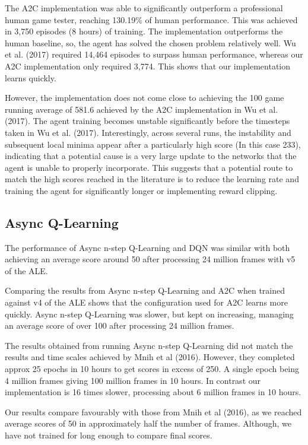 \documentclass{article}
\begin{document}
The A2C implementation was able to significantly outperform a professional human game tester, reaching 130.19\% of human performance. This was achieved in 3,750 episodes (8 hours) of training. The implementation outperforms the human baseline, so, the agent has solved the chosen problem relatively well. Wu et al. (2017) required 14,464 episodes to surpass human performance, whereas our A2C implementation only required 3,774. This shows that our implementation learns quickly.

However, the implementation does not come close to achieving the 100 game running average of 581.6 achieved by the A2C implementation in Wu et al. (2017). The agent training becomes unstable significantly before the timesteps taken in Wu et al. (2017). Interestingly, across several runs, the instability and subsequent local minima appear after a particularly high score (In this case 233), indicating that a potential cause is a very large update to the networks that the agent is unable to properly incorporate. This suggests that a potential route to match the high scores reached in the literature is to reduce the learning rate and training the agent for significantly longer or implementing reward clipping.


\subsection{Async Q-Learning}

The performance of Async n-step Q-Learning and DQN was similar with both achieving an average score around 50 after processing 24 million frames with v5 of the ALE.

Comparing the results from Async n-step Q-Learning and A2C when trained against v4 of the ALE shows that the configuration used for A2C  learns more quickly. Async n-step Q-Learning was slower, but kept on increasing, managing an average score of over 100 after processing 24 million frames.

The results obtained from running Async n-step Q-Learning did not match the results and time scales achieved by Mnih et al (2016). However, they completed approx 25 epochs in 10 hours to get scores in excess of 250. A single epoch being 4 million frames giving 100 million frames in 10 hours. In contrast our implementation is 16 times slower, processing about 6 million frames in 10 hours.

Our results compare favourably with those from Mnih et al (2016), as we reached average scores of 50 in approximately half the number of frames. Although, we have not trained for long enough to compare final scores.
\end{document}
